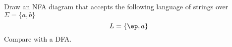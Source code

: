 Draw an NFA diagram that accepts the following
language of strings over $\Sigma =
\{ a, b \}$ 
\[
L = \{\ep, a\}
\]
Compare with a DFA.
